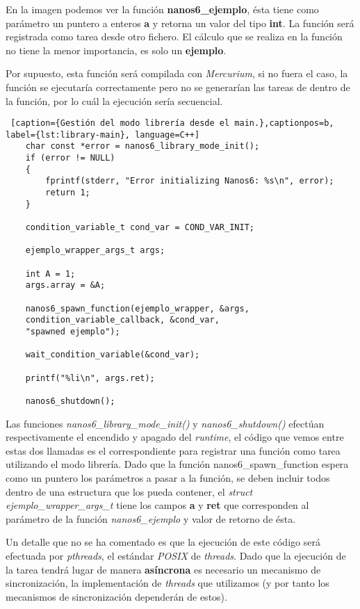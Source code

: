 En la imagen podemos ver la función \textbf{nanos6\_ejemplo}, ésta tiene como parámetro un puntero a enteros \textbf{a} y retorna un valor del tipo \textbf{int}. La función será registrada como tarea desde otro fichero. El cálculo que se realiza en la función no tiene la menor importancia, es solo un \textbf{ejemplo}. \medskip

Por supuesto, esta función será compilada con \textit{Mercurium}, si no fuera el caso, la función se ejecutaría correctamente pero no se generarían las tareas de dentro de la función, por lo cuál la ejecución sería secuencial. 

\begin{lstlisting} [caption={Gestión del modo librería desde el main.},captionpos=b, label={lst:library-main}, language=C++]
    char const *error = nanos6_library_mode_init();
    if (error != NULL)
    {
        fprintf(stderr, "Error initializing Nanos6: %s\n", error);
        return 1;
    }

    condition_variable_t cond_var = COND_VAR_INIT;

    ejemplo_wrapper_args_t args;

    int A = 1;
    args.array = &A;
    
    nanos6_spawn_function(ejemplo_wrapper, &args, 
    condition_variable_callback, &cond_var, 
    "spawned ejemplo");

    wait_condition_variable(&cond_var);

    printf("%li\n", args.ret);

    nanos6_shutdown();

\end{lstlisting}

Las funciones \textit{nanos6\_library\_mode\_init()} y \textit{nanos6\_shutdown()} efectúan respectivamente el encendido y apagado del \textit{runtime}, el código que vemos entre estas dos llamadas es el correspondiente para registrar una función como tarea utilizando el modo librería. Dado que la función nanos6\_spawn\_function espera como un puntero los parámetros a pasar a la función, se deben incluir todos dentro de una estructura que los pueda contener, el \textit{struct} \textit{ejemplo\_wrapper\_args\_t} tiene los campos \textbf{a} y \textbf{ret} que corresponden al parámetro de la función \textit{nanos6\_ejemplo} y valor de retorno de ésta.

\bigskip
Un detalle que no se ha comentado es que la ejecución de este código será efectuada por \textit{pthreads}, el estándar \textit{POSIX} de \textit{threads}. Dado que la ejecución de la tarea tendrá lugar de manera \textbf{asíncrona} es necesario un mecanismo de sincronización, la implementación de \textit{threads} que utilizamos (y por tanto los mecanismos de sincronización dependerán de estos).

